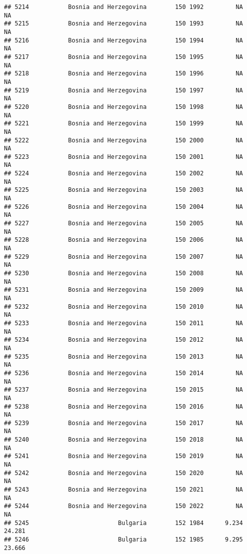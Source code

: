 \documentclass[
]{article}
\begin{document}
\begin{verbatim}
## 5214           Bosnia and Herzegovina        150 1992         NA         NA
## 5215           Bosnia and Herzegovina        150 1993         NA         NA
## 5216           Bosnia and Herzegovina        150 1994         NA         NA
## 5217           Bosnia and Herzegovina        150 1995         NA         NA
## 5218           Bosnia and Herzegovina        150 1996         NA         NA
## 5219           Bosnia and Herzegovina        150 1997         NA         NA
## 5220           Bosnia and Herzegovina        150 1998         NA         NA
## 5221           Bosnia and Herzegovina        150 1999         NA         NA
## 5222           Bosnia and Herzegovina        150 2000         NA         NA
## 5223           Bosnia and Herzegovina        150 2001         NA         NA
## 5224           Bosnia and Herzegovina        150 2002         NA         NA
## 5225           Bosnia and Herzegovina        150 2003         NA         NA
## 5226           Bosnia and Herzegovina        150 2004         NA         NA
## 5227           Bosnia and Herzegovina        150 2005         NA         NA
## 5228           Bosnia and Herzegovina        150 2006         NA         NA
## 5229           Bosnia and Herzegovina        150 2007         NA         NA
## 5230           Bosnia and Herzegovina        150 2008         NA         NA
## 5231           Bosnia and Herzegovina        150 2009         NA         NA
## 5232           Bosnia and Herzegovina        150 2010         NA         NA
## 5233           Bosnia and Herzegovina        150 2011         NA         NA
## 5234           Bosnia and Herzegovina        150 2012         NA         NA
## 5235           Bosnia and Herzegovina        150 2013         NA         NA
## 5236           Bosnia and Herzegovina        150 2014         NA         NA
## 5237           Bosnia and Herzegovina        150 2015         NA         NA
## 5238           Bosnia and Herzegovina        150 2016         NA         NA
## 5239           Bosnia and Herzegovina        150 2017         NA         NA
## 5240           Bosnia and Herzegovina        150 2018         NA         NA
## 5241           Bosnia and Herzegovina        150 2019         NA         NA
## 5242           Bosnia and Herzegovina        150 2020         NA         NA
## 5243           Bosnia and Herzegovina        150 2021         NA         NA
## 5244           Bosnia and Herzegovina        150 2022         NA         NA
## 5245                         Bulgaria        152 1984      9.234     24.281
## 5246                         Bulgaria        152 1985      9.295     23.666

\end{verbatim}
\end{document}
